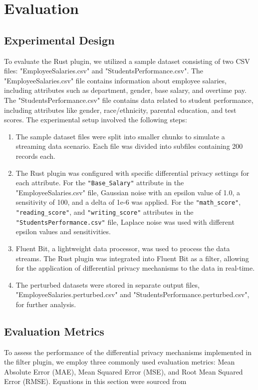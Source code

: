 \chapter{Evaluation\label{chap:evaluation}}
\section{Experimental Design}
To evaluate the Rust plugin, we utilized a sample dataset consisting of two CSV files: "EmployeeSalaries.csv" and "StudentsPerformance.csv". The "EmployeeSalaries.csv" file contains information about employee salaries, including attributes such as department, gender, base salary, and overtime pay. The "StudentsPerformance.csv" file contains data related to student performance, including attributes like gender, race/ethnicity, parental education, and test scores.
The experimental setup involved the following steps:

\begin{enumerate}
    \item The sample dataset files were split into smaller chunks to simulate a streaming data scenario. Each file was divided into subfiles containing 200 records each.
    \item The Rust plugin was configured with specific differential privacy settings for each attribute. For the \texttt{"Base\_Salary"} attribute in the "EmployeeSalaries.csv" file, Gaussian noise with an epsilon value of 1.0, a sensitivity of 100, and a delta of 1e-6 was applied. For the \texttt{"math\_score"}, \texttt{"reading\_score"}, and \texttt{"writing\_score"} attributes in the \texttt{"StudentsPerformance.csv"} file, Laplace noise was used with different epsilon values and sensitivities.
    \item Fluent Bit, a lightweight data processor, was used to process the data streams. The Rust plugin was integrated into Fluent Bit as a filter, allowing for the application of differential privacy mechanisms to the data in real-time.
    \item The perturbed datasets were stored in separate output files, "EmployeeSalaries.perturbed.csv" and "StudentsPerformance.perturbed.csv", for further analysis.
\end{enumerate}
\section{Evaluation Metrics}
To assess the performance of the differential privacy mechanisms implemented in the filter plugin, we employ three commonly used evaluation metrics: Mean Absolute Error (MAE), Mean Squared Error (MSE), and Root Mean Squared Error (RMSE). Equations in this section were sourced from \cite{Hodson2022}
